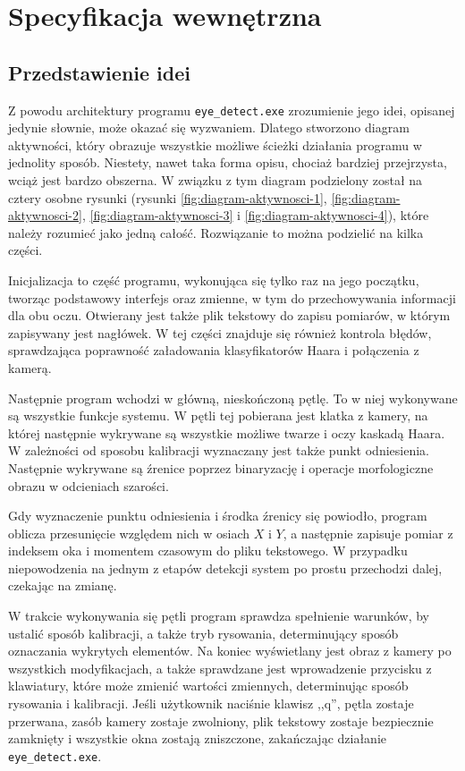 \documentclass[a4paper,twoside,12pt]{book}
\begin{document}
%
%
%
\chapter{Specyfikacja wewnętrzna}
\label{ch:Specyfikacja-wewnetrzna}

\section{Przedstawienie idei}
\label{sec:Przedstawienie-idei}

Z powodu architektury programu \texttt{eye\-\_detect.exe} zrozumienie jego idei, opisanej jedynie słownie, może okazać się wyzwaniem. Dlatego stworzono diagram aktywności, który obrazuje wszystkie możliwe ścieżki działania programu w jednolity sposób. Niestety, nawet taka forma opisu, chociaż bardziej przejrzysta, wciąż jest bardzo obszerna. W związku z tym diagram podzielony został na cztery osobne rysunki (rysunki \ref{fig:diagram-aktywnosci-1}, \ref{fig:diagram-aktywnosci-2}, \ref{fig:diagram-aktywnosci-3} i \ref{fig:diagram-aktywnosci-4}), które należy rozumieć jako jedną całość. Rozwiązanie to można podzielić na kilka części.

Inicjalizacja to część programu, wykonująca się tylko raz na jego początku, tworząc podstawowy interfejs oraz zmienne, w tym do przechowywania informacji dla obu oczu. Otwierany jest także plik tekstowy do zapisu pomiarów, w którym zapisywany jest nagłówek. W tej części znajduje się również kontrola błędów, sprawdzająca poprawność załadowania klasyfikatorów Haara i połączenia z kamerą.

Następnie program wchodzi w główną, nieskończoną pętlę. To w niej wykonywane są wszystkie funkcje systemu. W pętli tej pobierana jest klatka z kamery, na której następnie wykrywane są wszystkie możliwe twarze i oczy kaskadą Haara. W zależności od sposobu kalibracji wyznaczany jest także punkt odniesienia. Następnie wykrywane są źrenice poprzez binaryzację i operacje morfologiczne obrazu w odcieniach szarości.

Gdy wyznaczenie punktu odniesienia i środka źrenicy się powiodło, program oblicza przesunięcie względem nich w osiach $X$ i $Y$, a następnie zapisuje pomiar z indeksem oka i momentem czasowym do pliku tekstowego. W przypadku niepowodzenia na jednym z etapów detekcji system po prostu przechodzi dalej, czekając na zmianę.

W trakcie wykonywania się pętli program sprawdza spełnienie warunków, by ustalić sposób kalibracji, a także tryb rysowania, determinujący sposób oznaczania wykrytych elementów. Na koniec wyświetlany jest obraz z kamery po wszystkich modyfikacjach, a także sprawdzane jest wprowadzenie przycisku z klawiatury, które może zmienić wartości zmiennych, determinując sposób rysowania i kalibracji. Jeśli użytkownik naciśnie klawisz ,,q'', pętla zostaje przerwana, zasób kamery zostaje zwolniony, plik tekstowy zostaje bezpiecznie zamknięty i wszystkie okna zostają zniszczone, zakańczając działanie \texttt{eye\-\_detect.exe}. 
\end{document}
